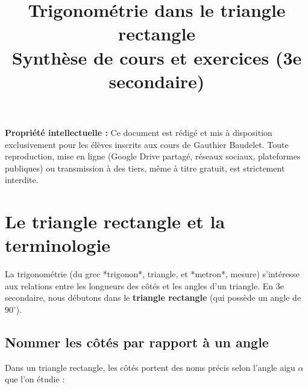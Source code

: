 \documentclass[11pt,a4paper]{article}
\title{\textbf{Trigonométrie dans le triangle rectangle}\\[2pt]\large Synthèse de cours et exercices (3e secondaire)}
\author{}
\date{}
\begin{document}
\maketitle
\thispagestyle{fancy}
\vspace{-2cm}
\textbf{Propriété intellectuelle :} Ce document est rédigé et mis à disposition exclusivement pour les élèves inscrits aux cours de Gauthier Baudelet. Toute reproduction, mise en ligne (Google Drive partagé, réseaux sociaux, plateformes publiques) ou transmission à des tiers, même à titre gratuit, est strictement interdite.
\section{Le triangle rectangle et la terminologie}

La trigonométrie (du grec *trigonon*, triangle, et *metron*, mesure) s'intéresse aux relations entre les longueurs des côtés et les angles d'un triangle. En 3e secondaire, nous débutons dans le \textbf{triangle rectangle} (qui possède un angle de $90^\circ$).

\subsection{Nommer les côtés par rapport à un angle}

Dans un triangle rectangle, les côtés portent des noms précis selon l'angle aigu $\alpha$ que l'on étudie :

\begin{center}
\end{center}
\end{document}
